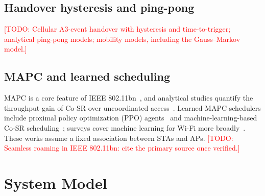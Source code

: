 \documentclass{ieeeaccess}
\newcommand{\todo}[1]{\textcolor{red}{[TODO: #1]}}
\begin{document}
\subsection{Handover hysteresis and ping-pong}
\todo{Cellular A3-event handover with hysteresis and time-to-trigger; analytical ping-pong models; mobility models, including the Gauss--Markov model.}

\subsection{MAPC and learned scheduling}
MAPC is a core feature of IEEE 802.11bn~\cite{galati2024wifi8,lopez2019ieee}, and analytical studies quantify the throughput gain of Co-SR over uncoordinated access~\cite{wilhelmi2023csr}. Learned MAPC schedulers include proximal policy optimization (PPO) agents~\cite{nunez2026drl} and machine-learning-based Co-SR scheduling~\cite{wojnar2025csr}; surveys cover machine learning for Wi-Fi more broadly~\cite{szott2022wifiml}. These works assume a fixed association between STAs and APs. \todo{Seamless roaming in IEEE 802.11bn: cite the primary source once verified.}

\section{System Model}
\label{sec:system}
\end{document}

